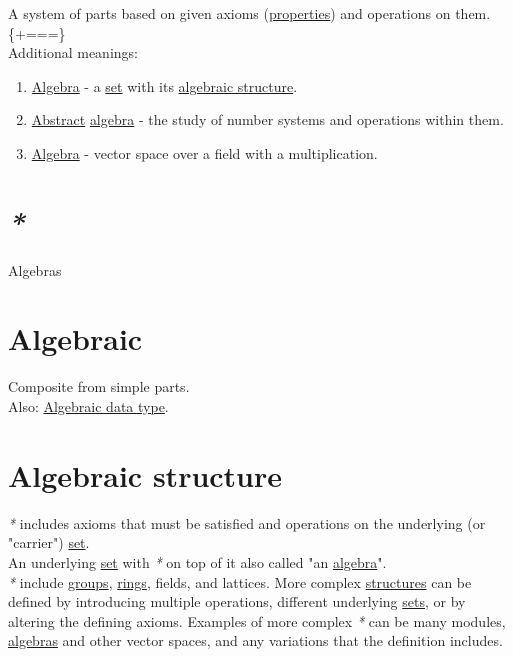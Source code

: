 \documentclass[a4paper,14pt,oneside]{book}
\begin{document}
A system of parts based on given axioms (\hyperref[orgf686c2e]{properties}) and operations on them.\\


\{\footnotesize +===\}\\

Additional meanings:\\

\begin{enumerate}
\item \hyperref[org268c431]{Algebra} - a \hyperref[org08ec83a]{set} with its \hyperref[org21d8734]{algebraic structure}.\\
\item \hyperref[orgdf45506]{Abstract} \hyperref[org268c431]{algebra} - the study of number systems and operations within them.\\
\item \hyperref[org268c431]{Algebra} - vector space over a field with a multiplication.\\
\end{enumerate}

\section{\emph{*}}
\label{sec:org28afaed}

\label{org321b761}Algebras\\

\section{\label{org784b47d}Algebraic}
\label{sec:orgad41e2d}
Composite from simple parts.\\

Also: \hyperref[orgea02da8]{Algebraic data type}.\\

\section{\label{org21d8734}Algebraic structure}
\label{sec:orge7b66d8}
\emph{*} includes axioms that must be satisfied and operations on the underlying (or "carrier") \hyperref[org08ec83a]{set}.\\

An underlying \hyperref[org08ec83a]{set} with \emph{*} on top of it also called "an \hyperref[org268c431]{algebra}".\\

\emph{*} include \hyperref[org506cc75]{groups}, \hyperref[org6faaa69]{rings}, fields, and lattices. More complex \hyperref[org9605870]{structures} can be defined by introducing multiple operations, different underlying \hyperref[org720aebf]{sets}, or by altering the defining axioms. Examples of more complex \emph{*} can be many modules, \hyperref[org321b761]{algebras} and other vector spaces, and any variations that the definition includes.\\
\end{document}
